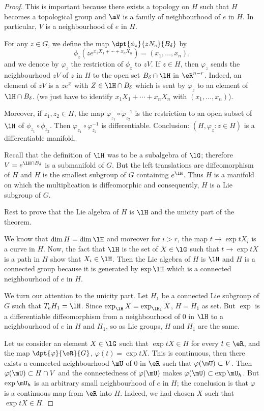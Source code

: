\begin{proof}
	This is important because there exists a topology on $H$ such that $H$ becomes a topological group and $\mV$ is a family of neighbourhood of $e$ in $H$. In particular, $V$ is a neighbourhood of $e$ in $H$.

	For any $z\in G$, we define the map $\dpt{\phi_z}{zN_e}{B_{\delta}}$ by
	\begin{equation}
		\phi_z(ze^{x_1X_1+\cdots+x_nX_n})=(x_1,\ldots,x_n),
	\end{equation}
	and we denote by $\varphi_z$ the restriction of $\phi_z$ to $zV$. If $z\in H$, then $\varphi_z$ sends the neighbourhood $zV$ of $z$ in $H$ to the open set $B_{\delta}\cap\lH$ in $\eR^{n-r}$. Indeed, an element of $zV$ is a $ze^Z$ with $Z\in\lH\cap B_{\delta}$ which is sent by $\varphi_z$ to an element of $\lH\cap B_{\delta}$. (we just have to identify $x_1X_1+\cdots+x_nX_n$ with $(x_1,\ldots,x_n)$).

	Moreover, if $z_1,z_2\in H$, the map $\varphi_{z_1}\circ\varphi_{z_2}^{-1}$ is the restriction to an open subset of $\lH$ of $\phi_{z_1}\circ\phi_{z_2}$. Then $\varphi_{z_1}\circ\varphi_{z_2}^{-1}$ is differentiable. Conclusion: $(H,\varphi_z: z\in H)$ is a differentiable manifold.

	Recall that the definition of $\lH$ was to be a subalgebra of $\lG$; therefore $V=e^{\lH\cap B_{\delta}}$ is a submanifold of $G$. But the left translations are diffeomorphism of $H$ and $H$ is the smallest subgroup of $G$ containing $e^{\lH}$. Thus $H$ is a manifold on which the multiplication is diffeomorphic and consequently, $H$ is a Lie subgroup of $G$.

	Rest to prove that the Lie algebra of $H$ is $\lH$ and the unicity part of the theorem.

	We know that $\dim H=\dim\lH$ and moreover for $i>r$, the map $t\to\exp tX_i$ is a curve in $H$. Now, the fact that $\lH$ is the set of $X\in\lG$ such that $t\to\exp tX$ is a path in $H$ show that $X_i\in\lH$. Then the Lie algebra of $H$ is $\lH$ and $H$ is a connected group because it is generated by $\exp\lH$ which is a connected neighbourhood of $e$ in $H$.

	We turn our attention to the unicity part. Let $H_1$ be a connected Lie subgroup of $G$ such that $T_eH_1=\lH$. Since $\exp_{\lH}X=\exp_{\lH_1}X$, $H=H_1$ as set. But $\exp$ is a differentiable diffeomorphism from a neighbourhood of $0$ in $\lH$ to a neighbourhood of $e$ in $H$ and $H_1$, so as Lie groups, $H$ and $H_1$ are the same.

	Let us consider an element $X\in\lG$ such that $\exp tX\in H$ for every $t\in\eR$, and the map $\dpt{\varphi}{\eR}{G}$, $\varphi(t)=\exp tX$. This is continuous, then there exists a connected neighbourhood $\mU$ of $0$ in $\eR$ such that $\varphi(\mU)\subset V$. Then $\varphi(\mU)\subset H\cap V$ and the connectedness of $\varphi(\mU)$ makes $\varphi(\mU)\subset\exp\mU_h$. But $\exp\mU_h$ is an arbitrary small neighbourhood of $e$ in $H$; the conclusion is that $\varphi$ is a continuous map from $\eR$ into $H$. Indeed, we had chosen $X$ such that $\exp tX\in H$.


\end{proof}
